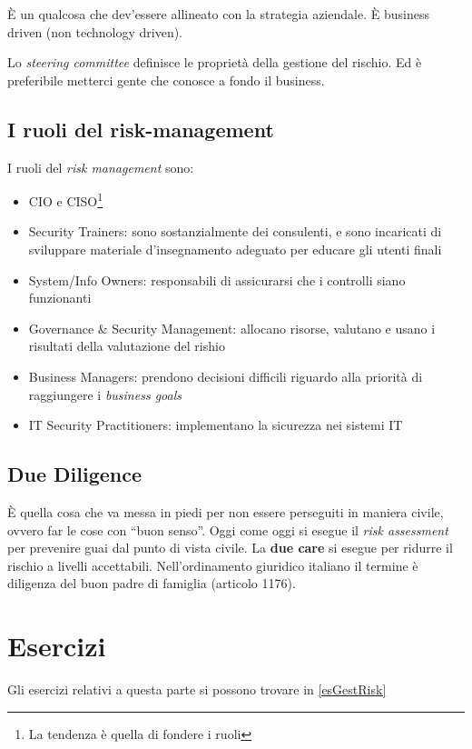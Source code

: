 È un qualcosa che dev'essere allineato con la strategia aziendale.
È business driven (non technology driven).

Lo \textit{steering committee} definisce le proprietà della gestione del rischio.
Ed è preferibile metterci gente che conosce a fondo il business.

\subsection{I ruoli del risk-management}

I ruoli del \textit{risk management} sono:
\begin{itemize}
\item CIO e CISO\footnote{La tendenza è quella di fondere i ruoli}
\item Security Trainers: sono sostanzialmente dei consulenti, e sono incaricati
di sviluppare materiale d'insegnamento adeguato per educare gli utenti finali
\item System/Info Owners: responsabili di assicurarsi che i controlli siano
funzionanti
\item Governance \& Security Management: allocano risorse, valutano e usano i
risultati della valutazione del rishio
\item Business Managers: prendono decisioni difficili riguardo alla priorità
di raggiungere i \textit{business goals}
\item IT Security Practitioners: implementano la sicurezza nei sistemi IT
\end{itemize}

\subsection{Due Diligence}

È quella cosa che va messa in piedi per non essere perseguiti in maniera civile,
ovvero far le cose con ``buon senso''. Oggi come oggi si esegue il \textit{risk
assessment} per prevenire guai dal punto di vista civile. La \textbf{due care}
si esegue per ridurre il rischio a livelli accettabili. Nell'ordinamento
giuridico italiano il termine è diligenza del buon padre di famiglia (articolo
1176).


\section{Esercizi}

Gli esercizi relativi a questa parte si possono trovare in \ref{esGestRisk}
